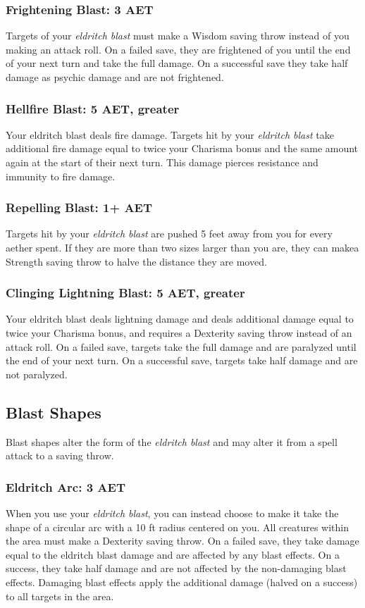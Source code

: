\subsubsection{Frightening Blast: 3 AET}
Targets of your \textit{eldritch blast} must make a Wisdom saving throw instead of you making an attack roll. On a failed save, they are frightened of you until the end of your next turn and take the full damage. On a successful save they take half damage as psychic damage and are not frightened.

\subsubsection{Hellfire Blast: 5 AET, greater}
Your eldritch blast deals fire damage. Targets hit by your \textit{eldritch blast} take additional fire damage equal to twice your Charisma bonus and the same amount again at the start of their next turn. This damage pierces resistance and immunity to fire damage.

\subsubsection{Repelling Blast: 1+ AET}
Targets hit by your \textit{eldritch blast} are pushed 5 feet away from you for every aether spent. If they are more than two sizes larger than you are, they can makea Strength saving throw to halve the distance they are moved.

\subsubsection{Clinging Lightning Blast: 5 AET, greater}
Your eldritch blast deals lightning damage and deals additional damage equal to twice your Charisma bonus, and requires a Dexterity saving throw instead of an attack roll. On a failed save, targets take the full damage and are paralyzed until the end of your next turn. On a successful save, targets take half damage and are not paralyzed.

\subsection{Blast Shapes}
Blast shapes alter the form of the \textit{eldritch blast} and may alter it from a spell attack to a saving throw.

\subsubsection{Eldritch Arc: 3 AET}
When you use your \textit{eldritch blast}, you can instead choose to make it take the shape of a circular arc with a 10 ft radius centered on you. All creatures within the area must make a Dexterity saving throw. On a failed save, they take damage equal to the eldritch blast damage and are affected by any blast effects. On a success, they take half damage and are not affected by the non-damaging blast effects. Damaging blast effects apply the additional damage (halved on a success) to all targets in the area.

